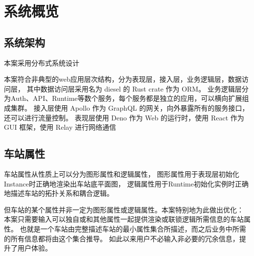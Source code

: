 \section{系统概览}
\subsection{系统架构}
本案采用分布式系统设计



本案符合非典型的web应用层次结构，分为表现层，接入层，业务逻辑层，数据访问层，
其中数据访问层采用名为 diesel 的 Rust crate 作为 ORM。
业务逻辑层分为Auth、API、Runtime等数个服务，每个服务都是独立的应用，可以横向扩展组成集群。
接入层使用 Apollo 作为 GraphQL 的网关，向外暴露所有的服务接口，还可以进行流量控制。
表现层使用 Deno 作为 Web 的运行时，使用 React 作为 GUI 框架，使用 Relay 进行网络通信


\subsection{车站属性}
车站属性从性质上可以分为图形属性和逻辑属性，
图形属性用于表现层初始化Instance时正确地渲染出车站底平面图，
逻辑属性用于Runtime初始化实例时正确地描述车站的拓扑关系和耦合逻辑。

但车站的某个属性并非一定为图形属性或逻辑属性。本案特别地为此做出优化：
本案只需要输入可以独自或和其他属性一起提供渲染或联锁逻辑所需信息的车站属性。
也就是一个车站由完整描述车站的最小属性集合所描述，而之后业务中所需的所有信息都将由这个集合推导。
如此以来用户不必输入非必要的冗余信息，提升了用户体验。

